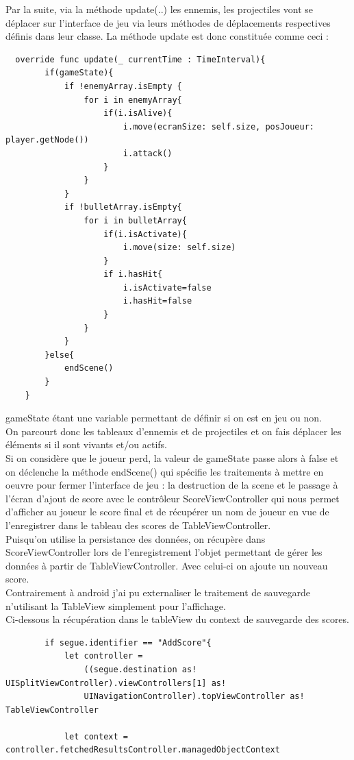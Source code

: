 \documentclass{article}
\begin{document}
Par la suite, via la méthode update(..) les ennemis, les projectiles vont se déplacer sur l'interface de jeu via leurs méthodes de déplacements respectives définis dans leur classe. La méthode update est donc constituée comme ceci : 
\begin{verbatim}
  override func update(_ currentTime : TimeInterval){
        if(gameState){
            if !enemyArray.isEmpty {
                for i in enemyArray{
                    if(i.isAlive){
                        i.move(ecranSize: self.size, posJoueur: player.getNode())
                        i.attack()
                    }
                }
            }
            if !bulletArray.isEmpty{
                for i in bulletArray{
                    if(i.isActivate){
                        i.move(size: self.size)
                    }
                    if i.hasHit{
                        i.isActivate=false
                        i.hasHit=false
                    }
                }
            }
        }else{
            endScene()
        }
    }
\end{verbatim}
gameState étant une variable permettant de définir si on est en jeu ou non.\\ 
On parcourt donc les tableaux d'ennemis et de projectiles et on fais déplacer les éléments si il sont vivants et/ou actifs. \\
Si on considère que le joueur perd, la valeur de gameState passe alors à false et on déclenche la méthode endScene() qui spécifie les traitements à mettre en oeuvre pour fermer l'interface de jeu : la destruction de la scene et le passage à l'écran d'ajout de score avec le contrôleur ScoreViewController qui nous permet d'afficher au joueur le score final et de récupérer un nom de joueur en vue de l'enregistrer dans le tableau des scores de TableViewController. \\ 
Puisqu'on utilise la persistance des données, on récupère dans ScoreViewController lors de l'enregistrement l'objet permettant de gérer les données à partir de TableViewController. Avec celui-ci on ajoute un nouveau score.\\ 
Contrairement à android j'ai pu externaliser le traitement de sauvegarde n'utilisant la TableView simplement pour l'affichage. \\
Ci-dessous la récupération dans le tableView du context de sauvegarde des scores. 
\begin{verbatim}
        if segue.identifier == "AddScore"{
            let controller =
                ((segue.destination as! UISplitViewController).viewControllers[1] as!
                UINavigationController).topViewController as! TableViewController
            
            let context = controller.fetchedResultsController.managedObjectContext
\end{verbatim}
\end{document}
